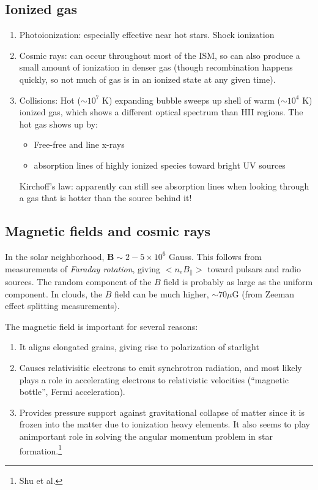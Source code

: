 \documentclass[12pt]{article}
\newcommand{\mar}[1]{\hspace{0pt}\marginpar{-\textcolor{black}{#1}-}}
\begin{document}
\subsection{Ionized gas}
\begin{enumerate}[label=\alph*)]
    \item Photoionization: especially effective near hot stars. Shock
        ionization
    \item Cosmic rays: can occur throughout most of the ISM, so can also
        produce a small amount of ionization in denser gas (though
        recombination happens quickly, so not much of gas is in an
        ionized state at any given time).
    \item \mar{11}Collisions: Hot ($\sim 10^{7}$ K) expanding bubble
        sweeps up shell of warm ($\sim 10^{4}$ K) ionized gas, which shows
        a different optical spectrum than HII regions. The hot gas shows
        up by:
        \begin{itemize}
            \item Free-free and line x-rays
            \item absorption lines of highly ionized species toward
                bright UV sources
        \end{itemize}
        Kirchoff's law: apparently can still see absorption lines when looking
        through a gas that is hotter than the source behind it!
\end{enumerate}

\subsection{Magnetic fields and cosmic rays}
\mar{13}In the solar neighborhood, $\mathbf{B} \sim 2-5\times10^{6}$ Gauss.
This follows from measurements of \textit{Faraday rotation}, giving
$<n_{e}B_{||}>$ toward pulsars and radio sources. The random component of
the $B$ field is probably as large as the uniform component. In clouds,
the $B$ field can be much higher, $\sim 70 \mu$G (from Zeeman effect splitting
measurements).

The magnetic field is important for several reasons:
\begin{enumerate}
    \item It aligns elongated grains, giving rise to polarization
        of starlight
    \item Causes relativisitic electrons to emit synchrotron radiation,
        and most likely plays a role in accelerating electrons to
        relativistic velocities (``magnetic bottle'', Fermi acceleration).
    \item Provides pressure support against gravitational collapse of matter
        since it is frozen into the matter due to ionization heavy elements.
        It also seems to play animportant role in solving the angular momentum
        problem in star formation.\footnote{Shu et al.}
\end{enumerate}
\end{document}
